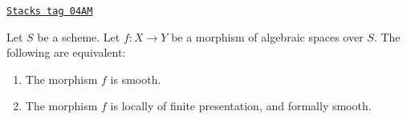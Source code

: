 \begin{lemma}

\label{spaces-more-morphisms-lemma-smooth-formally-smooth}
\href{https://stacks.math.columbia.edu/tag/04AM}{\texttt{Stacks tag 04AM}}

Let $S$ be a scheme.
Let $f : X \to Y$ be a morphism of algebraic spaces over $S$.
The following are equivalent:
\begin{enumerate}
\item The morphism $f$ is smooth.
\item The morphism $f$ is locally of finite presentation, and
formally smooth.
\end{enumerate}
\end{lemma}

